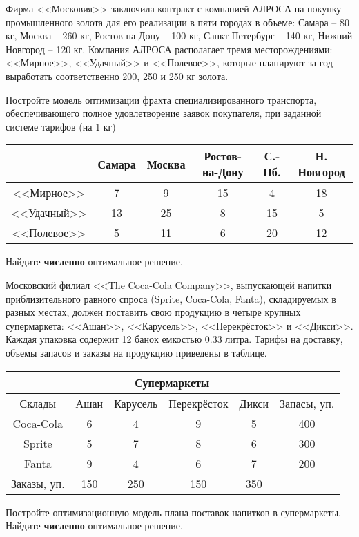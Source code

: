 \begin{exercise}%
Фирма <<Московия>> заключила контракт с компанией АЛРОСА на покупку
промышленного золота для его реализации в пяти городах в объеме:
Самара -- 80 кг, Москва -- 260 кг, Ростов-на-Дону -- 100 кг,
Санкт-Петербург -- 140 кг, Нижний Новгород -- 120 кг. Компания
АЛРОСА располагает тремя месторождениями: <<Мирное>>, <<Удачный>> и
<<Полевое>>, которые планируют за год выработать соответственно
200, 250 и 250 кг золота.

Постройте модель оптимизации фрахта специализированного транспорта,
обеспечивающего полное удовлетворение заявок покупателя, при
заданной системе тарифов (на 1 кг)
\begin{center}\small
	\begin{tabular}{|c|c|c|c|c|c|}
	\hline
	& Самара & Москва & Ростов-на-Дону & С.-Пб. & Н. Новгород \\ \hline
	<<Мирное>> & 7 & 9 & 15 & 4 & 18\\
	<<Удачный>> & 13 & 25 & 8 & 15 & 5 \\
	<<Полевое>> & 5 & 11 & 6 & 20 & 12\\
	\hline
	\end{tabular}
\end{center}
Найдите \textbf{численно} оптимальное решение.
\end{exercise}

\begin{exercise}
Московский филиал <<The Coca-Cola Company>>, выпускающей напитки
приблизительного равного спроса (Sprite, Coca-Cola, Fanta),
складируемых в разных местах, должен поставить свою продукцию в
четыре крупных супермаркета: <<Ашан>>, <<Карусель>>, <<Перекрёсток>> и <<Дикси>>. 
Каждая упаковка содержит 12 банок
емкостью 0.33 литра. Тарифы на доставку, объемы запасов и заказы на
продукцию приведены в таблице.
\begin{center}\footnotesize
	\begin{tabular}{|c|c|c|c|c|c|}
	\hline
	& \multicolumn{4}{|c|}{Супермаркеты} & \\ \hline
	Склады & Ашан & Карусель & Перекрёсток& Дикси &
	Запасы, уп.
	\\ \hline
	Coca-Cola & 6 & 4 & 9 & 5 & 400 \\
	Sprite & 5 & 7 & 8 & 6 & 300 \\
	Fanta & 9 & 4 & 6 & 7 & 200 \\ \hline
	Заказы, уп. & 150 & 250 & 150 & 350 &  \\
	\hline
	\end{tabular}
\end{center}
Постройте оптимизационную модель плана поставок напитков в
супермаркеты. Найдите \textbf{численно} оптимальное решение.
\end{exercise}

